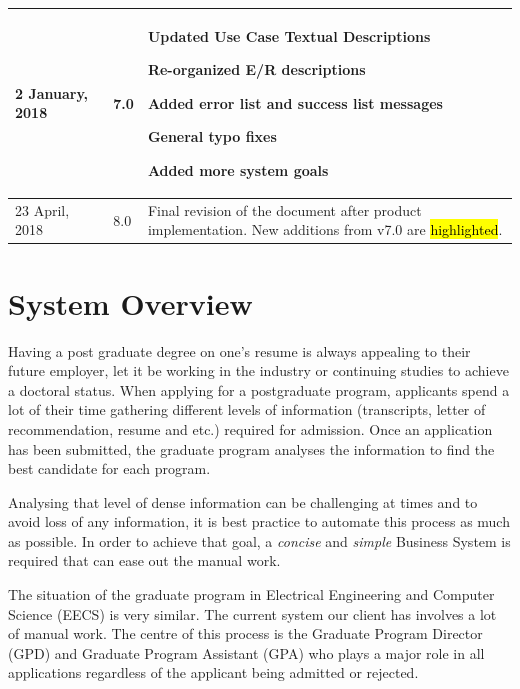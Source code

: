 \documentclass[fontsize=12pt,paper=letter,twoside]{scrartcl}
\begin{document}
\begin{tabular}{|l|l|p{3.5in}|}
\hline
2 January, 2018
& 7.0
& \begin{mylist}
\item Updated Use Case Textual Descriptions 
\item Re-organized E/R descriptions
\item Added error list and success list messages
\item General typo fixes
\item Added more system goals
\end{mylist} \\  
\hline
23 April, 2018
& 8.0
& Final revision of the document after product implementation. New additions from v7.0 are \hl{highlighted}. \\
\hline
\end{tabular}

\newpage

\tableofcontents
\listoffigures
\listoftables
\newpage



\clearpage
\section{System Overview}

Having a post graduate degree on one's resume is always appealing to their future employer, let it be working in the industry or continuing studies to achieve a doctoral status. When applying for a postgraduate program, applicants spend a lot of their time gathering different levels of information (transcripts, letter of recommendation, resume and etc.) required for admission. Once an application has been submitted, the graduate program analyses the information to find the best candidate for each program.

Analysing that level of dense information can be challenging at times and to avoid loss of any information, it is best practice to automate this process as much as possible. In order to achieve that goal, a \emph{concise} and \emph{simple} Business System is required that can ease out the manual work.

The situation of the graduate program in Electrical Engineering and Computer Science (EECS) is very similar. The current system our client has involves a lot of manual work. The centre of this process is the Graduate Program Director (GPD) and Graduate Program Assistant (GPA) who plays a major role in all applications regardless of the applicant being admitted or rejected.
\end{document}
